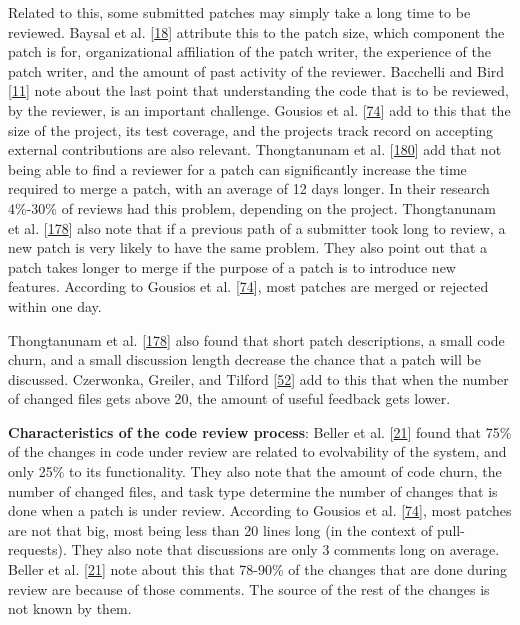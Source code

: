 \documentclass[]{book}
\begin{document}
Related to this, some submitted patches may simply take a long time to
be reviewed. Baysal et al.
{[}\protect\hyperlink{ref-baysal2016investigating}{18}{]} attribute this
to the patch size, which component the patch is for, organizational
affiliation of the patch writer, the experience of the patch writer, and
the amount of past activity of the reviewer. Bacchelli and Bird
{[}\protect\hyperlink{ref-bacchelli2013expectations}{11}{]} note about
the last point that understanding the code that is to be reviewed, by
the reviewer, is an important challenge. Gousios et al.
{[}\protect\hyperlink{ref-gousios2014exploratory}{74}{]} add to this
that the size of the project, its test coverage, and the projects track
record on accepting external contributions are also relevant.
Thongtanunam et al.
{[}\protect\hyperlink{ref-thongtanunam2015should}{180}{]} add that not
being able to find a reviewer for a patch can significantly increase the
time required to merge a patch, with an average of 12 days longer. In
their research 4\%-30\% of reviews had this problem, depending on the
project. Thongtanunam et al.
{[}\protect\hyperlink{ref-thongtanunam2017review}{178}{]} also note that
if a previous path of a submitter took long to review, a new patch is
very likely to have the same problem. They also point out that a patch
takes longer to merge if the purpose of a patch is to introduce new
features. According to Gousios et al.
{[}\protect\hyperlink{ref-gousios2014exploratory}{74}{]}, most patches
are merged or rejected within one day.

Thongtanunam et al.
{[}\protect\hyperlink{ref-thongtanunam2017review}{178}{]} also found
that short patch descriptions, a small code churn, and a small
discussion length decrease the chance that a patch will be discussed.
Czerwonka, Greiler, and Tilford
{[}\protect\hyperlink{ref-czerwonka2015code}{52}{]} add to this that
when the number of changed files gets above 20, the amount of useful
feedback gets lower.

\textbf{Characteristics of the code review process}: Beller et al.
{[}\protect\hyperlink{ref-beller2014modern}{21}{]} found that 75\% of
the changes in code under review are related to evolvability of the
system, and only 25\% to its functionality. They also note that the
amount of code churn, the number of changed files, and task type
determine the number of changes that is done when a patch is under
review. According to Gousios et al.
{[}\protect\hyperlink{ref-gousios2014exploratory}{74}{]}, most patches
are not that big, most being less than 20 lines long (in the context of
pull-requests). They also note that discussions are only 3 comments long
on average. Beller et al.
{[}\protect\hyperlink{ref-beller2014modern}{21}{]} note about this that
78-90\% of the changes that are done during review are because of those
comments. The source of the rest of the changes is not known by them.
\end{document}
